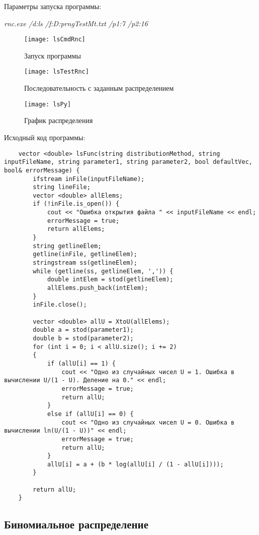\documentclass[bachelor, och, coursework]{shiza}
\begin{document}
	Параметры запуска программы:
	
	\textit{rnc.exe /d:ls /f:D:prngTestMt.txt /p1:7 /p2:16}
	
	
	\begin{figure}[H]
		\centering
		\texttt{[image: lsCmdRnc]}
		\caption{Запуск программы}
		\label{fig:lsCmdRnc}
	\end{figure}
	
	\begin{figure}[H]
		\centering
		\texttt{[image: lsTestRnc]}
		\caption{Последовательность с заданным распределением}
		\label{fig:lsTestRnc}
	\end{figure}
	
	\begin{figure}[H]
		\centering
		\texttt{[image: lsPy]}
		\caption{График распределения}
		\label{fig:lsPy}
	\end{figure}
	
	Исходный код программы:
	
	\begin{verbatim}
	vector <double> lsFunc(string distributionMethod, string inputFileName, string parameter1, string parameter2, bool defaultVec, bool& errorMessage) {
		ifstream inFile(inputFileName);
		string lineFile;
		vector <double> allElems;
		if (!inFile.is_open()) {
			cout << "Ошибка открытия файла " << inputFileName << endl;
			errorMessage = true;
			return allElems;
		}
		string getlineElem;
		getline(inFile, getlineElem);
		stringstream ss(getlineElem);
		while (getline(ss, getlineElem, ',')) {
			double intElem = stod(getlineElem);
			allElems.push_back(intElem);
		}
		inFile.close();
		
		vector <double> allU = XtoU(allElems);
		double a = stod(parameter1);
		double b = stod(parameter2);
		for (int i = 0; i < allU.size(); i += 2)
		{
			if (allU[i] == 1) {
				cout << "Одно из случайных чисел U = 1. Ошибка в вычислении U/(1 - U). Деление на 0." << endl;
				errorMessage = true;
				return allU;
			}
			else if (allU[i] == 0) {
				cout << "Одно из случайных чисел U = 0. Ошибка в вычислении ln(U/(1 - U))" << endl;
				errorMessage = true;
				return allU;
			}
			allU[i] = a + (b * log(allU[i] / (1 - allU[i])));
		}
		
		return allU;
	}	
	\end{verbatim}

	
	\subsection{Биномиальное распределение}
\end{document}
